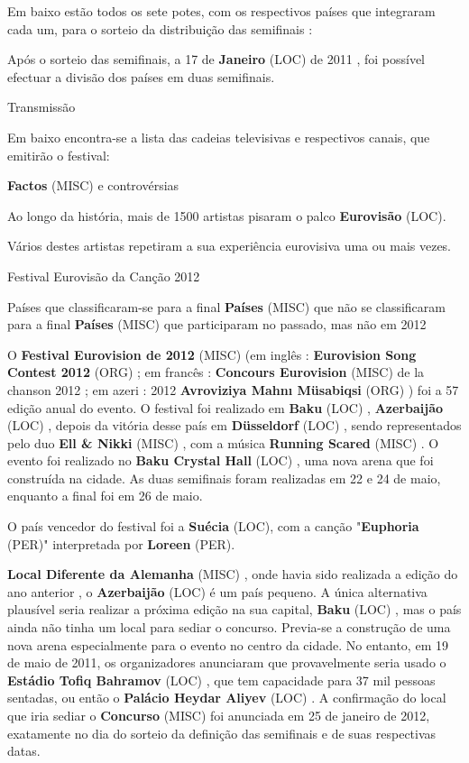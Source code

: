 \documentclass[12pt,a4paper]{article}
\begin{document}
Em baixo estão todos os sete potes, com os respectivos países que integraram cada um, para o sorteio da distribuição das semifinais :

Após o sorteio das semifinais, a 17 de \textbf{Janeiro} (LOC) de 2011 , foi possível efectuar a divisão dos países em duas semifinais.



Transmissão

Em baixo encontra-se a lista das cadeias televisivas e respectivos canais, que emitirão o festival:



\textbf{Factos} (MISC) e controvérsias

Ao longo da história, mais de 1500 artistas pisaram o palco \textbf{Eurovisão} (LOC).

Vários destes artistas repetiram a sua experiência eurovisiva uma ou mais vezes.



Festival Eurovisão da Canção 2012



Países que classificaram-se para a final \textbf{Países} (MISC) que não se classificaram para a final \textbf{Países} (MISC) que participaram no passado, mas não em 2012

O \textbf{Festival Eurovision de 2012} (MISC) (em inglês : \textbf{Eurovision Song Contest 2012} (ORG) ; em francês : \textbf{Concours Eurovision} (MISC) de la chanson 2012 ; em azeri : 2012 \textbf{Avroviziya Mahnı Müsabiqsi} (ORG) ) foi a 57 edição anual do evento. O festival foi realizado em \textbf{Baku} (LOC) , \textbf{Azerbaijão} (LOC) , depois da vitória desse país em \textbf{Düsseldorf} (LOC) , sendo representados pelo duo \textbf{Ell \& Nikki} (MISC) , com a música \textbf{Running Scared} (MISC) . O evento foi realizado no \textbf{Baku Crystal Hall} (LOC) , uma nova arena que foi construída na cidade. As duas semifinais foram realizadas em 22 e 24 de maio, enquanto a final foi em 26 de maio.

O país vencedor do festival foi a \textbf{Suécia} (LOC), com a canção "\textbf{Euphoria} (PER)" interpretada por \textbf{Loreen} (PER).



\textbf{Local Diferente da Alemanha} (MISC) , onde havia sido realizada a edição do ano anterior , o \textbf{Azerbaijão} (LOC) é um país pequeno. A única alternativa plausível seria realizar a próxima edição na sua capital, \textbf{Baku} (LOC) , mas o país ainda não tinha um local para sediar o concurso. Previa-se a construção de uma nova arena especialmente para o evento no centro da cidade. No entanto, em 19 de maio de 2011, os organizadores anunciaram que provavelmente seria usado o \textbf{Estádio Tofiq Bahramov} (LOC) , que tem capacidade para 37 mil pessoas sentadas, ou então o \textbf{Palácio Heydar Aliyev} (LOC) . A confirmação do local que iria sediar o \textbf{Concurso} (MISC) foi anunciada em 25 de janeiro de 2012, exatamente no dia do sorteio da definição das semifinais e de suas respectivas datas.
\end{document}
